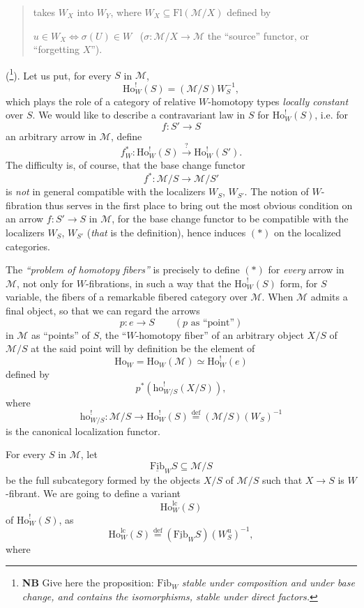 \documentclass[11pt]{article}
\newcommand{\printedpage}[1]{\marginpar{\footnotesize p.~#1}}
\newcommand{\msp}[1]{\marginpar{\footnotesize [#1]}}
\newcommand{\cM}{\mathcal{M}}
\newcommand{\Ho}{\mathrm{Ho}}
\newcommand{\ho}{\mathrm{ho}}
\newcommand{\Fl}{\mathrm{Fl}}
\newcommand{\Fib}{\underline{\mathrm{Fib}}}
\newcommand{\Wu}{W^{\mathrm{u}}}
\newcommand{\lc}{\mathrm{lc}}
\begin{document}
\printedpage{135}

\begin{quote}
takes $W_X$ into $W_Y$, where $W_X \subseteq \Fl(\cM/X)$ defined by

$u \in W_X \iff \sigma(U) \in W$ \ ($\sigma : \cM/X \longrightarrow \cM$ the ``source'' functor, or ``forgetting $X$''). %
\end{quote}

(\footnote[120]{\textbf{NB} Give here the proposition: $\mathrm{Fib}_W$ \textit{stable under composition and under base change, and contains the isomorphisms, stable under direct factors.}}). Let us put, for every $S$ in $\cM$,
\[
\Ho^!_W(S) = (\cM/S)W_S^{-1},
\]
which plays the role of a category of relative $W$-homotopy types \textit{locally constant} over $S$. We would like to describe a contravariant law in $S$ for $\Ho^!_W(S)$, i.e. for
\[
f : S' \longrightarrow S
\]
an arbitrary arrow in $\cM$, define
\[
f^*_W : \Ho^!_W(S) \xrightarrow{?} \Ho^!_W(S'). \tag*{$(*)$}
\]
The difficulty is, of course, that the base change functor
\[
f^* : \cM/S \longrightarrow \cM/S'
\]
is \textit{not} in general compatible with the \msp{page 209} localizers $W_S$, $W_{S'}$. The notion of $W$-fibration thus serves in the first place to bring out the most obvious condition on an arrow $f : S' \longrightarrow S$ in $\cM$, for the base change functor to be compatible with the localizers $W_S$, $W_{S'}$ (\textit{that} is the definition), hence induces $(*)$ on the localized categories.

The \textit{``problem of homotopy fibers''} is precisely to define $(*)$ for \textit{every} arrow in $\cM$, not only for $W$-fibrations, in such a way that the $\Ho^!_W(S)$ form, for $S$ %
variable, the fibers of a remarkable fibered category over $\cM$. When $\cM$ admits a final object, so that we can regard the arrows
\[
p : e \longrightarrow S \qquad (p \text{ as ``point''})
\]
in $\cM$ as ``points'' of $S$, the ``$W$-homotopy fiber'' of an arbitrary object $X/S$ of $\cM/S$ at the said point will by definition be the element of
\[
\Ho_W = \Ho_W(\cM) \simeq \Ho^!_W(e)
\]
defined by
\[
p^*(\ho^!_{W/S}(X/S)),
\]
\printedpage{136}
\msp{page 210}
where
\[
\ho^!_{W/S} : \cM/S \longrightarrow \Ho^!_W(S) \overset{\text{def}}{=} (\cM/S)(W_S)^{-1}
\]
is the canonical localization functor.

For every $S$ in $\cM$, let
\[
\Fib_W S \subseteq \cM/S
\]
be the full subcategory formed by the objects $X/S$ of $\cM/S$ such that $X \longrightarrow S$ is $W$-fibrant. We are going to define a variant
\[
\Ho^{\lc}_W(S)
\]
of $\Ho^!_W(S)$, as
\[
\Ho^{\lc}_W(S) \overset{\text{def}}{=} (\Fib_W S)(\Wu_S)^{-1},
\]
where
\end{document}
